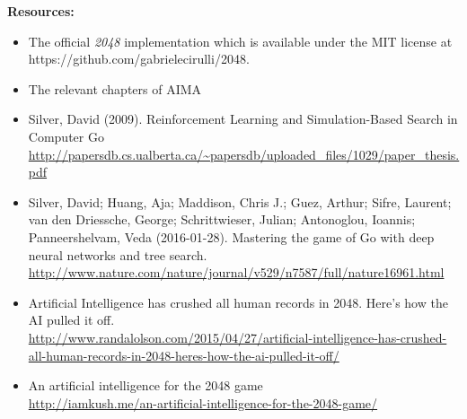 \documentclass[12pt]{article}
\begin{document}
\textbf{Resources: }
\begin{itemize}
	\item The official \textit{2048} implementation which is available under the MIT license at\\ 
    https://github.com/gabrielecirulli/2048.
	\item The relevant chapters of AIMA
	\item Silver, David (2009). Reinforcement Learning and Simulation-Based Search in Computer Go \url{http://papersdb.cs.ualberta.ca/~papersdb/uploaded_files/1029/paper_thesis.pdf}
	\item Silver, David; Huang, Aja; Maddison, Chris J.; Guez, Arthur; Sifre, Laurent; van den Driessche, George; Schrittwieser, Julian; Antonoglou, Ioannis; Panneershelvam, Veda (2016-01-28). Mastering the game of Go with deep neural networks and tree search. \url{http://www.nature.com/nature/journal/v529/n7587/full/nature16961.html}
	\item Artificial Intelligence has crushed all human records in 2048.  Here's how the AI pulled it off.\\
    \url{http://www.randalolson.com/2015/04/27/artificial-intelligence-has-crushed-all-human-records-in-2048-heres-how-the-ai-pulled-it-off/}
	\item An artificial intelligence for the 2048 game \\
    \url{http://iamkush.me/an-artificial-intelligence-for-the-2048-game/}
   
\end{itemize}
\end{document}
